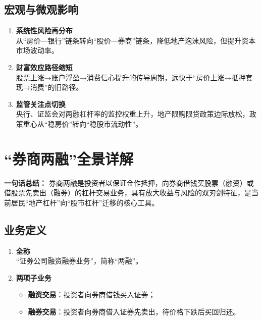 \subsection{宏观与微观影响}
\begin{enumerate}[leftmargin=*, nosep]
    \item \textbf{系统性风险再分布}  \\
    从“房价—银行”链条转向“股价—券商”链条，降低地产泡沫风险，但提升资本市场波动率。
    \item \textbf{财富效应路径缩短}  \\
    股票上涨→账户浮盈→消费信心提升的传导周期，远快于“房价上涨→抵押套现→消费”的旧路径。
    \item \textbf{监管关注点切换}  \\
    央行、证监会对两融杠杆率的监控权重上升，地产限购限贷政策边际放松，政策重心从“稳房价”转向“稳股市流动性”。
\end{enumerate}

{\color{red}\section{“券商两融”全景详解}}
\textbf{一句话总结：}  
券商两融是投资者以保证金作抵押，向券商借钱买股票（融资）或借股票先卖出（融券）的杠杆交易业务，具有放大收益与风险的双刃剑特征，是当前居民“地产杠杆”向“股市杠杆”迁移的核心工具。

\subsection{业务定义}
\begin{enumerate}[leftmargin=*, nosep]
    \item \textbf{全称}  \\
    “证券公司融资融券业务”，简称“两融”。
    \item \textbf{两项子业务}  
    \begin{itemize}[nosep]
        \item \textbf{融资交易}：投资者向券商借钱买入证券；  
        \item \textbf{融券交易}：投资者向券商借入证券先卖出，待价格下跌后买回归还。
    \end{itemize}
\end{enumerate}

